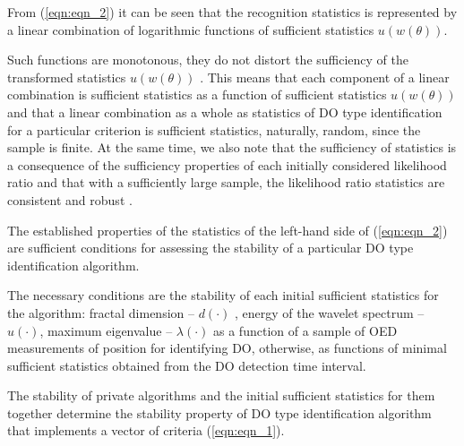 From (\ref{eqn:eqn_2}) it can be seen that the recognition statistics is represented by a linear combination of logarithmic functions of sufficient statistics $u(w(\theta))$.
 
Such functions are monotonous, they do not distort the sufficiency of the transformed statistics $u(w(\theta))$ \cite{bib_09,bib_10}.
This means that each component of a linear combination is sufficient statistics as a function of sufficient statistics $u(w(\theta))$ and that a linear combination as a whole as statistics of DO type identification for a particular criterion is sufficient statistics, naturally, random, since the sample is finite.
At the same time, we also note that the sufficiency of statistics is a consequence of the sufficiency properties of each initially considered likelihood ratio \cite{bib_09} and that with a sufficiently large sample, the likelihood ratio statistics are consistent and robust \cite{bib_10}.

The established properties of the statistics of the left-hand side of (\ref{eqn:eqn_2}) are sufficient conditions for assessing the stability of a particular DO type identification algorithm.

The necessary conditions are the stability of each initial sufficient statistics for the algorithm: fractal dimension -- $d(\cdot)$ , energy of the wavelet spectrum -- $u(\cdot)$, maximum eigenvalue -- $\lambda(\cdot)$ as a function of a sample of OED measurements of position for identifying DO, otherwise, as functions of minimal sufficient statistics obtained from the DO detection time interval. 

The stability of private algorithms and the initial sufficient statistics for them together determine the stability property of DO type identification algorithm that implements a vector of criteria (\ref{eqn:eqn_1}).

